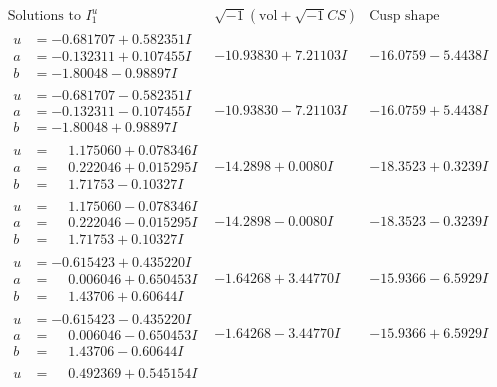 \documentclass[1p]{elsarticle_modified}
\theoremstyle{definition}
\newcommand{\I}{\sqrt{-1}}
\begin{document}
$$\begin{array}{c|c|c}  
\text{Solutions to }I^u_{1}& \I (\text{vol} + \sqrt{-1}CS) & \text{Cusp shape}\\
 \hline 
\begin{aligned}
u &= -0.681707 + 0.582351 I \\
a &= -0.132311 + 0.107455 I \\
b &= -1.80048 - 0.98897 I\end{aligned}
 & -10.93830 + 7.21103 I & -16.0759 - 5.4438 I \\ \hline\begin{aligned}
u &= -0.681707 - 0.582351 I \\
a &= -0.132311 - 0.107455 I \\
b &= -1.80048 + 0.98897 I\end{aligned}
 & -10.93830 - 7.21103 I & -16.0759 + 5.4438 I \\ \hline\begin{aligned}
u &= \phantom{-}1.175060 + 0.078346 I \\
a &= \phantom{-}0.222046 + 0.015295 I \\
b &= \phantom{-}1.71753 - 0.10327 I\end{aligned}
 & -14.2898 + 0.0080 I & -18.3523 + 0.3239 I \\ \hline\begin{aligned}
u &= \phantom{-}1.175060 - 0.078346 I \\
a &= \phantom{-}0.222046 - 0.015295 I \\
b &= \phantom{-}1.71753 + 0.10327 I\end{aligned}
 & -14.2898 - 0.0080 I & -18.3523 - 0.3239 I \\ \hline\begin{aligned}
u &= -0.615423 + 0.435220 I \\
a &= \phantom{-}0.006046 + 0.650453 I \\
b &= \phantom{-}1.43706 + 0.60644 I\end{aligned}
 & -1.64268 + 3.44770 I & -15.9366 - 6.5929 I \\ \hline\begin{aligned}
u &= -0.615423 - 0.435220 I \\
a &= \phantom{-}0.006046 - 0.650453 I \\
b &= \phantom{-}1.43706 - 0.60644 I\end{aligned}
 & -1.64268 - 3.44770 I & -15.9366 + 6.5929 I \\ \hline\begin{aligned}
u &= \phantom{-}0.492369 + 0.545154 I \\

\end{aligned}
\end{array}$$
\end{document}
